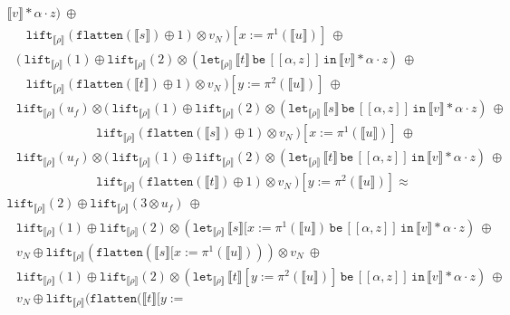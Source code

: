 \documentclass[runningheads,a4paper]{llncs}
\newcommand{\typeinterpret}[1]{\llbracket #1 \rrbracket}
\newcommand{\interpret}[1]{\llbracket #1 \rrbracket}
\newcommand{\expair}[2]{[#1,#2]}
\newcommand{\flatten}{\mathtt{flatten}}
\newcommand{\lift}{\mathtt{lift}}
\newcommand{\xlet}[4]{\mathtt{let}_{#1}\,#2\,\mathtt{be}\,[#3]\,\mathtt{in}\,#4}
\begin{document}
\begin{itemize}
\[\begin{array}{l}
{      \interpret{v} * \alpha \cdot z})\ \oplus \\
  \phantom{AB}
    \lift_{\typeinterpret{\rho}}(\flatten(\interpret{s}) \oplus 1)
    \otimes v_N\ )[x:=\pi^1(\interpret{u})]\ \oplus \\
  \phantom{A}
  (\ \lift_{\typeinterpret{\rho}}(1) \oplus
    \lift_{\typeinterpret{\rho}}(2) \otimes
    (\xlet{\typeinterpret{\rho}}{\interpret{t}}{\expair{\alpha}{z}}{
      \interpret{v} * \alpha \cdot z})\ \oplus \\
  \phantom{AB}
    \lift_{\typeinterpret{\rho}}(\flatten(\interpret{t}) \oplus 1)
    \otimes v_N\ )[y:=\pi^2(\interpret{u})]\ \oplus \\
  \phantom{A}
  \lift_{\typeinterpret{\rho}}(u_f) \otimes
  (\ \lift_{\typeinterpret{\rho}}(1) \oplus
    \lift_{\typeinterpret{\rho}}(2) \otimes
    (\xlet{\typeinterpret{\rho}}{\interpret{s}}{\expair{\alpha}{z}}{
      \interpret{v} * \alpha \cdot z})\ \oplus \\
  \phantom{ABCDEFGHIJ}
    \lift_{\typeinterpret{\rho}}(\flatten(\interpret{s}) \oplus 1)
    \otimes v_N\ )[x:=\pi^1(\interpret{u})]\ \oplus \\
  \phantom{A}
  \lift_{\typeinterpret{\rho}}(u_f) \otimes
  (\ \lift_{\typeinterpret{\rho}}(1) \oplus
    \lift_{\typeinterpret{\rho}}(2) \otimes
    (\xlet{\typeinterpret{\rho}}{\interpret{t}}{\expair{\alpha}{z}}{
      \interpret{v} * \alpha \cdot z})\ \oplus \\
  \phantom{ABCDEFGHIJ}
    \lift_{\typeinterpret{\rho}}(\flatten(\interpret{t}) \oplus 1)
    \otimes v_N\ )[y:=\pi^2(\interpret{u})] \approx \\
  \lift_{\typeinterpret{\rho}}(2) \oplus
  \lift_{\typeinterpret{\rho}}(3 \otimes u_f)\ \oplus \\
  \phantom{A}
  \lift_{\typeinterpret{\rho}}(1) \oplus
  \lift_{\typeinterpret{\rho}}(2) \otimes
  (\xlet{\typeinterpret{\rho}}{\interpret{s}[x:=\pi^1(\interpret{u})}{
    \expair{\alpha}{z}}{\interpret{v} * \alpha \cdot z})\ \oplus \\
  \phantom{A}
  v_N \oplus \lift_{\typeinterpret{\rho}}(\flatten(\interpret{s}[x:=
    \pi^1(\interpret{u}))) \otimes v_N\ \oplus \\
  \phantom{A}
  \lift_{\typeinterpret{\rho}}(1) \oplus
    \lift_{\typeinterpret{\rho}}(2) \otimes
    (\xlet{\typeinterpret{\rho}}{\interpret{t}[y:=\pi^2(\interpret{u})]}{
    \expair{\alpha}{z}}{\interpret{v} * \alpha \cdot z})\ \oplus \\
  \phantom{A}
  v_N \oplus \lift_{\typeinterpret{\rho}}(\flatten(\interpret{t}[y:=

\end{array}\]
\end{itemize}
\end{document}

